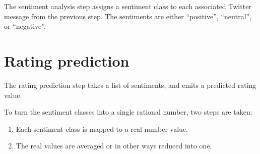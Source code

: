 The sentiment analysis step assigns a sentiment class to each associated Twitter message from the previous step. The sentiments are either ``positive'', ``neutral'', or ``negative''.


\section{Rating prediction} %
\label{sec:rating_prediction_step}

The rating prediction step takes a list of sentiments, and emits a predicted rating value.

To turn the sentiment classes into a single rational number, two steps are taken:

\begin{enumerate}
  \item Each sentiment class is mapped to a real number value.
  \item The real values are averaged or in other ways reduced into one.
\end{enumerate}


